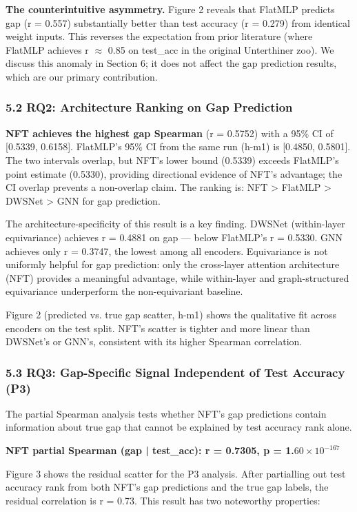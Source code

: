 \textbf{The counterintuitive asymmetry.} Figure 2 reveals that FlatMLP predicts gap (r = 0.557) substantially
better than test accuracy (r = 0.279) from identical weight inputs. This reverses the expectation from
prior literature (where FlatMLP achieves r $\approx$ 0.85 on test\_acc in the original Unterthiner zoo). We
discuss this anomaly in Section 6; it does not affect the gap prediction results, which are our
primary contribution.

\subsubsection{5.2 RQ2: Architecture Ranking on Gap Prediction}

\textbf{NFT achieves the highest gap Spearman} (r = 0.5752) with a 95\% CI of [0.5339, 0.6158]. FlatMLP's
95\% CI from the same run (h-m1) is [0.4850, 0.5801]. The two intervals overlap, but NFT's lower bound
(0.5339) exceeds FlatMLP's point estimate (0.5330), providing directional evidence of NFT's advantage;
the CI overlap prevents a non-overlap claim. The ranking is: NFT > FlatMLP > DWSNet > GNN for gap
prediction.

The architecture-specificity of this result is a key finding. DWSNet (within-layer equivariance)
achieves r = 0.4881 on gap --- below FlatMLP's r = 0.5330. GNN achieves only r = 0.3747, the lowest
among all encoders. Equivariance is not uniformly helpful for gap prediction: only the cross-layer
attention architecture (NFT) provides a meaningful advantage, while within-layer and graph-structured
equivariance underperform the non-equivariant baseline.

Figure 2 (predicted vs. true gap scatter, h-m1) shows the qualitative fit across encoders on the test
split. NFT's scatter is tighter and more linear than DWSNet's or GNN's, consistent with its higher
Spearman correlation.

\subsubsection{5.3 RQ3: Gap-Specific Signal Independent of Test Accuracy (P3)}

The partial Spearman analysis tests whether NFT's gap predictions contain information about true gap
that cannot be explained by test accuracy rank alone.

\textbf{NFT partial Spearman (gap | test\_acc): r = 0.7305, p = 1.$60\times 10^{-167}$}

Figure 3 shows the residual scatter for the P3 analysis. After partialling out test accuracy rank
from both NFT's gap predictions and the true gap labels, the residual correlation is r = 0.73.
This result has two noteworthy properties:

